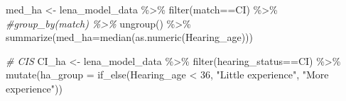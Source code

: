 \documentclass[
]{article}
\newenvironment{Shaded}{\begin{snugshade}}{\end{snugshade}}
\newcommand{\AttributeTok}[1]{\textcolor[rgb]{0.77,0.63,0.00}{#1}}
\newcommand{\CommentTok}[1]{\textcolor[rgb]{0.56,0.35,0.01}{\textit{#1}}}
\newcommand{\DecValTok}[1]{\textcolor[rgb]{0.00,0.00,0.81}{#1}}
\newcommand{\FunctionTok}[1]{\textcolor[rgb]{0.00,0.00,0.00}{#1}}
\newcommand{\NormalTok}[1]{#1}
\newcommand{\OtherTok}[1]{\textcolor[rgb]{0.56,0.35,0.01}{#1}}
\newcommand{\SpecialCharTok}[1]{\textcolor[rgb]{0.00,0.00,0.00}{#1}}
\newcommand{\StringTok}[1]{\textcolor[rgb]{0.31,0.60,0.02}{#1}}
\begin{document}
\begin{Shaded}
\begin{Highlighting}[]
\NormalTok{med\_ha }\OtherTok{\textless{}{-}}\NormalTok{ lena\_model\_data }\SpecialCharTok{\%\textgreater{}\%}
  \FunctionTok{filter}\NormalTok{(match}\SpecialCharTok{==}\StringTok{\textquotesingle{}CI\textquotesingle{}}\NormalTok{) }\SpecialCharTok{\%\textgreater{}\%}
  \CommentTok{\#group\_by(match) \%\textgreater{}\%}
  \FunctionTok{ungroup}\NormalTok{() }\SpecialCharTok{\%\textgreater{}\%}
  \FunctionTok{summarize}\NormalTok{(}\AttributeTok{med\_ha=}\FunctionTok{median}\NormalTok{(}\FunctionTok{as.numeric}\NormalTok{(Hearing\_age)))}

\CommentTok{\# CIS}
\NormalTok{CI\_ha }\OtherTok{\textless{}{-}}\NormalTok{ lena\_model\_data }\SpecialCharTok{\%\textgreater{}\%}
  \FunctionTok{filter}\NormalTok{(hearing\_status}\SpecialCharTok{==}\StringTok{\textquotesingle{}CI\textquotesingle{}}\NormalTok{) }\SpecialCharTok{\%\textgreater{}\%}
  \FunctionTok{mutate}\NormalTok{(}\AttributeTok{ha\_group =} \FunctionTok{if\_else}\NormalTok{(Hearing\_age }\SpecialCharTok{\textless{}} \DecValTok{36}\NormalTok{, }
                            \StringTok{"Little experience"}\NormalTok{, }
                            \StringTok{"More experience"}\NormalTok{))}


\end{Highlighting}
\end{Shaded}
\end{document}
